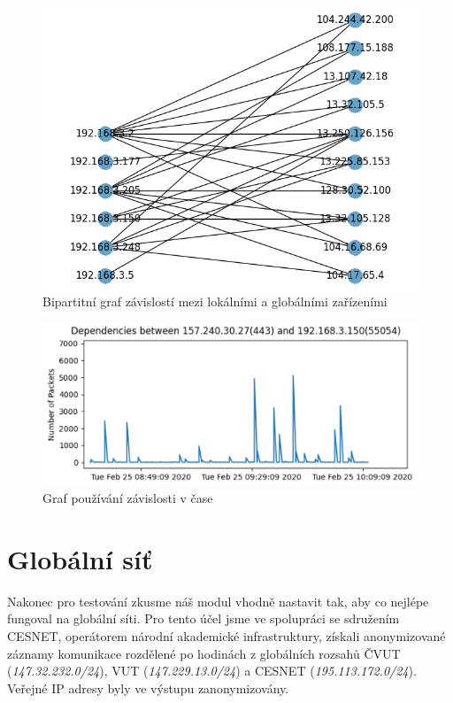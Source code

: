 \documentclass[thesis=B,czech,hidelinks]{FITthesis}[2019/03/21]
\begin{document}
    \begin{figure}[h!]
        \centering
        \includegraphics[scale=0.7]{Biparite_graph}
        \caption[Ukázka měření: Bipartitní graf závislostí mezi lokálními a globálními zařízeními pro síť v kanceláři]{Bipartitní graf závislostí mezi lokálními a globálními zařízeními}
        \label{GrafBipartite}
    \end{figure}
    
    \begin{figure}[h!]
        \centering
        \includegraphics[width=\textwidth]{TimeGraph.png}
        \caption[Ukázka měření: Graf používání závislosti v čase pro síť v kanceláři]{Graf používání závislosti v čase}
        \label{GrafTime}
    \end{figure}
    
    \newpage
    \section{Globální síť}
    Nakonec pro testování zkusme náš modul vhodně nastavit tak, aby co nejlépe fungoval na globální síti. Pro tento účel jsme ve spolupráci se sdružením CESNET, operátorem národní akademické infrastruktury, získali anonymizované záznamy komunikace rozdělené po hodinách z globálních rozsahů ČVUT (\emph{147.32.232.0/24}), VUT (\emph{147.229.13.0/24}) a CESNET (\emph{195.113.172.0/24}). Veřejné IP adresy byly ve výstupu zanonymizovány.
    
\end{document}
